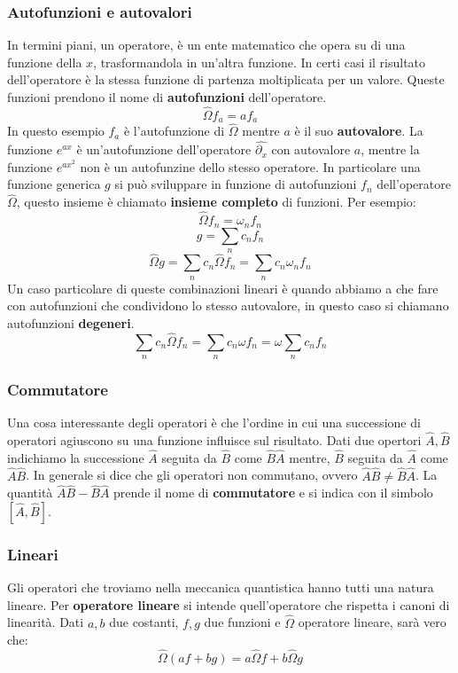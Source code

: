 \subsubsection{Autofunzioni e autovalori}
In termini piani, un operatore, è un ente matematico che opera su di una funzione della $x$, trasformandola in un'altra funzione. In certi casi il risultato dell'operatore è la stessa funzione di partenza moltiplicata per un valore. Queste funzioni prendono il nome di \textbf{autofunzioni} dell'operatore.
$$\hat{\Omega} f_a = a f_a$$
In questo esempio $f_a$ è l'autofunzione di $\hat{\Omega}$ mentre $a$ è il suo \textbf{autovalore}. La funzione $e^{ax}$ è un'autofunzione dell'operatore $\hat{\partial{}_x}$ con autovalore $a$, mentre la funzione $e^{ax^2}$ non è un autofunzine dello stesso operatore. In particolare una funzione generica $g$ si può sviluppare in funzione di autofunzioni $f_n$ dell'operatore $\hat{\Omega}$, questo insieme è chiamato \textbf{insieme completo} di funzioni. Per esempio:
$$\hat{\Omega} f_n = \omega_n f_n$$
$$g = \sum_n c_n f_n$$
$$\hat{\Omega} g = \sum_n c_n \hat{\Omega} f_n = \sum_n c_n \omega_n f_n$$
Un caso particolare di queste combinazioni lineari è quando abbiamo a che fare con autofunzioni che condividono lo stesso autovalore, in questo caso si chiamano autofunzioni \textbf{degeneri}.
$$\sum_n c_n \hat{\Omega} f_n = \sum_n c_n \omega f_n = \omega \sum_n c_n f_n$$

\subsubsection{Commutatore}
Una cosa interessante degli operatori è che l'ordine in cui una successione di operatori agiuscono su una funzione influisce sul risultato. Dati due opertori $\hat{A}, \hat{B}$ indichiamo la successione $\hat{A}$ seguita da $\hat{B}$ come $\hat{B}\hat{A}$ mentre, $\hat{B}$ seguita da $\hat{A}$ come $\hat{A}\hat{B}$.
In generale si dice che gli operatori non commutano, ovvero $\hat{A}\hat{B} \ne \hat{B}\hat{A}$. La quantità $\hat{A}\hat{B} - \hat{B}\hat{A}$ prende il nome di \textbf{commutatore} e si indica con il simbolo $[\hat{A},\hat{B}]$.

\subsubsection{Lineari}
Gli operatori che troviamo nella meccanica quantistica hanno tutti una natura lineare. Per \textbf{operatore lineare} si intende quell'operatore che rispetta i canoni di linearità. Dati $a, b$ due costanti, $f, g$ due funzioni e $\hat{\Omega}$ operatore lineare, sarà vero che:
$$\hat{\Omega}( af + bg ) = a \hat{\Omega} f + b \hat{\Omega} g$$


